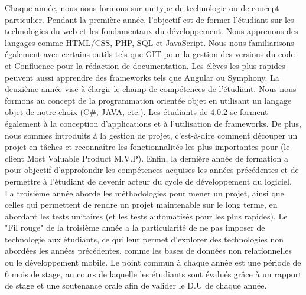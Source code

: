 \documentclass[12pt]{article}
\begin{document}
\newpage
\justify
\text
Chaque année, nous nous formons sur un type de technologie ou de concept particulier. Pendant la première année, l'objectif est de former l'étudiant sur les technologies du web et les fondamentaux du développement. Nous apprenons des langages comme HTML/CSS, PHP, SQL et JavaScript. Nous nous familiarisons également avec certains outils tels que GIT pour la gestion des versions du code et Confluence pour la rédaction de documentation. Les élèves les plus rapides peuvent aussi apprendre des frameworks tels que Angular ou Symphony.
\justify
\text
 La deuxième année vise à élargir le champ de compétences de l'étudiant. Nous nous formons au concept de la programmation orientée objet en utilisant un langage objet de notre choix (C\#, JAVA, etc.). Les étudiants de 4.0.2 se forment également à la conception d'applications et à l'utilisation de frameworks. De plus, nous sommes introduits à la gestion de projet, c'est-à-dire comment découper un projet en tâches et reconnaître les fonctionnalités les plus importantes pour (le client Most Valuable Product M.V.P).
\justify
\text
Enfin, la dernière année de formation a pour objectif d'approfondir les compétences acquises les années précédentes et de permettre à l'étudiant de devenir acteur du cycle de développement du logiciel. La troisième année aborde les méthodologies pour mener un projet, ainsi que celles qui permettent de rendre un projet maintenable sur le long terme, en abordant les tests unitaires (et les tests automatisés pour les plus rapides). Le "Fil rouge" de la troisième année a la particularité de ne pas imposer de technologie aux étudiants, ce qui leur permet d'explorer des technologies non abordées les années précédentes, comme les bases de données non relationnelles ou le développement mobile.
\justify
\text
Le point commun à chaque année est une période de 6 mois de stage, au cours de laquelle les étudiants sont évalués grâce à un rapport de stage et une soutenance orale afin de valider le D.U de chaque année.
\end{document}
